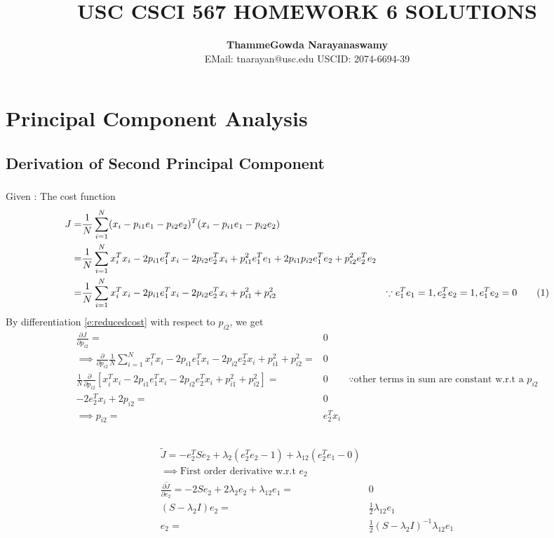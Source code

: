 \documentclass[a4paper,doc,notimes]{article}
\title{\noindent  \textbf{ USC CSCI 567 HOMEWORK 6 SOLUTIONS} }
\author{\textbf{ThammeGowda Narayanaswamy} \\
EMail: tnarayan@usc.edu  USCID: 2074-6694-39}
\newcommand\numberthis{\addtocounter{equation}{1}\tag{\theequation}}
\begin{document}
\maketitle


\section{Principal Component Analysis}
\subsection{ Derivation of Second Principal Component}
\subsubsection{}
Given : 
The cost function
\begin{align*}
 J = & \frac{1}{N} \sum_{i=1}^{N}(x_i - p_{i1}e_{1} - p_{i2}e_{2})^T (x_i - p_{i1}e_{1} - p_{i2}e_{2})  & \\  
   = &  \frac{1}{N} \sum_{i=1}^{N} x_i^Tx_i - 2p_{i1}e_1^Tx_i - 2p_{i2}e_2^Tx_i + p_{i1}^2e_1^Te_1 + 2 p_{i1}p_{i2}e_1^Te_2 + p_{i2}^2e_2^Te_2 & \\
   =&  \frac{1}{N} \sum_{i=1}^{N} x_i^Tx_i - 2p_{i1}e_1^Tx_i - 2p_{i2}e_2^Tx_i + p_{i1}^2 + p_{i2}^2  &   \because  e_1^Te_1 = 1, e_2^Te_2=1, e_1^Te_2 = 0   \numberthis \label{e:reducedcost}
\end{align*}
By differentiation \ref{e:reducedcost} with respect to $p_{i2}$, we get
\begin{align*}
 \frac{\partial J}{\partial p_{i2}} =  & 0 & \\
 \implies \frac{\partial}{\partial p_{i2}}  \frac{1}{N} \sum_{i=1}^{N} x_i^Tx_i - 2p_{i1}e_1^Tx_i - 2p_{i2}e_2^Tx_i + p_{i1}^2 + p_{i2}^2 = & 0 & \\
 \frac{1}{N}  \frac{\partial}{\partial p_{i2}}  [ x_i^Tx_i - 2p_{i1}e_1^Tx_i - 2p_{i2}e_2^Tx_i + p_{i1}^2 + p_{i2}^2 ] = & 0 & \because \text{other terms in sum are constant w.r.t a } p_{i2} \\
 - 2e_2^Tx_i + 2 p_{i2} = & 0 \\
\implies  p_{i2} = & e_2^Tx_i \\
\end{align*}

\subsubsection{}
\begin{align*}
 \tilde{J}  = -e_2^TSe_2 + \lambda_2(e_2^Te_2-1)+\lambda_{12}(e_2^Te_1-0) & \\
\implies  \text{First order derivative w.r.t } e_2 & \\
 \frac{\partial \tilde{J}}{\partial e_2}  = -2Se_2 + 2 \lambda_2 e_2 + \lambda_{12}e_1 = & 0 \\
(S -  \lambda_2 I) e_2 = & \frac{1}{2} \lambda_{12}e_1 \\
e_2 = & \frac{1}{2} (S -  \lambda_2 I)^{-1}  \lambda_{12}e_1 \\
\end{align*}
\end{document}
